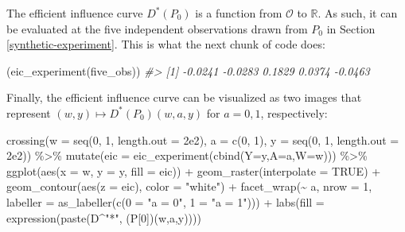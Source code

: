 \documentclass[
  11pt,
  openright,twoside]{book}
\newenvironment{Shaded}{\begin{snugshade}}{\end{snugshade}}
\newcommand{\AttributeTok}[1]{\textcolor[rgb]{0.77,0.63,0.00}{#1}}
\newcommand{\CommentTok}[1]{\textcolor[rgb]{0.56,0.35,0.01}{\textit{#1}}}
\newcommand{\ConstantTok}[1]{\textcolor[rgb]{0.00,0.00,0.00}{#1}}
\newcommand{\DecValTok}[1]{\textcolor[rgb]{0.00,0.00,0.81}{#1}}
\newcommand{\FloatTok}[1]{\textcolor[rgb]{0.00,0.00,0.81}{#1}}
\newcommand{\FunctionTok}[1]{\textcolor[rgb]{0.00,0.00,0.00}{#1}}
\newcommand{\NormalTok}[1]{#1}
\newcommand{\OtherTok}[1]{\textcolor[rgb]{0.56,0.35,0.01}{#1}}
\newcommand{\SpecialCharTok}[1]{\textcolor[rgb]{0.00,0.00,0.00}{#1}}
\newcommand{\StringTok}[1]{\textcolor[rgb]{0.31,0.60,0.02}{#1}}
\newcommand{\bbR}{\mathbb{R}}
\newcommand{\calO}{\mathcal{O}}
\theoremstyle{definition}
\theoremstyle{definition}
\theoremstyle{definition}
\theoremstyle{definition}
\theoremstyle{remark}
\begin{document}
The efficient influence curve \(D^{*}(P_{0})\) is a function from \(\calO\) to
\(\bbR\). As such, it can be evaluated at the five independent observations
drawn from \(P_{0}\) in Section \ref{synthetic-experiment}. This is what the
next chunk of code does:

\begin{Shaded}
\begin{Highlighting}[]
\NormalTok{(}\FunctionTok{eic\_experiment}\NormalTok{(five\_obs))}
\CommentTok{\#\textgreater{} [1] {-}0.0241 {-}0.0283  0.1829  0.0374 {-}0.0463}
\end{Highlighting}
\end{Shaded}

Finally, the efficient influence curve can be visualized as two images that
represent \((w,y) \mapsto D^{*}(P_{0})(w,a,y)\) for \(a = 0,1\), respectively:



\begin{Shaded}
\begin{Highlighting}[]
\FunctionTok{crossing}\NormalTok{(}\AttributeTok{w =} \FunctionTok{seq}\NormalTok{(}\DecValTok{0}\NormalTok{, }\DecValTok{1}\NormalTok{, }\AttributeTok{length.out =} \FloatTok{2e2}\NormalTok{),}
     \AttributeTok{a =} \FunctionTok{c}\NormalTok{(}\DecValTok{0}\NormalTok{, }\DecValTok{1}\NormalTok{),}
     \AttributeTok{y =} \FunctionTok{seq}\NormalTok{(}\DecValTok{0}\NormalTok{, }\DecValTok{1}\NormalTok{, }\AttributeTok{length.out =} \FloatTok{2e2}\NormalTok{)) }\SpecialCharTok{\%\textgreater{}\%}
  \FunctionTok{mutate}\NormalTok{(}\AttributeTok{eic =} \FunctionTok{eic\_experiment}\NormalTok{(}\FunctionTok{cbind}\NormalTok{(}\AttributeTok{Y=}\NormalTok{y,}\AttributeTok{A=}\NormalTok{a,}\AttributeTok{W=}\NormalTok{w))) }\SpecialCharTok{\%\textgreater{}\%}
  \FunctionTok{ggplot}\NormalTok{(}\FunctionTok{aes}\NormalTok{(}\AttributeTok{x =}\NormalTok{ w, }\AttributeTok{y =}\NormalTok{ y, }\AttributeTok{fill =}\NormalTok{ eic)) }\SpecialCharTok{+}
  \FunctionTok{geom\_raster}\NormalTok{(}\AttributeTok{interpolate =} \ConstantTok{TRUE}\NormalTok{) }\SpecialCharTok{+}
  \FunctionTok{geom\_contour}\NormalTok{(}\FunctionTok{aes}\NormalTok{(}\AttributeTok{z =}\NormalTok{ eic), }\AttributeTok{color =} \StringTok{"white"}\NormalTok{) }\SpecialCharTok{+}
  \FunctionTok{facet\_wrap}\NormalTok{(}\SpecialCharTok{\textasciitilde{}}\NormalTok{ a, }\AttributeTok{nrow =} \DecValTok{1}\NormalTok{,}
             \AttributeTok{labeller =} \FunctionTok{as\_labeller}\NormalTok{(}\FunctionTok{c}\NormalTok{(}\StringTok{\textasciigrave{}}\AttributeTok{0}\StringTok{\textasciigrave{}} \OtherTok{=} \StringTok{"a = 0"}\NormalTok{, }\StringTok{\textasciigrave{}}\AttributeTok{1}\StringTok{\textasciigrave{}} \OtherTok{=} \StringTok{"a = 1"}\NormalTok{))) }\SpecialCharTok{+}
  \FunctionTok{labs}\NormalTok{(}\AttributeTok{fill =} \FunctionTok{expression}\NormalTok{(}\FunctionTok{paste}\NormalTok{(D}\SpecialCharTok{\^{}}\StringTok{"*"}\NormalTok{, (P[}\DecValTok{0}\NormalTok{])(w,a,y))))}
\end{Highlighting}
\end{Shaded}
\end{document}

